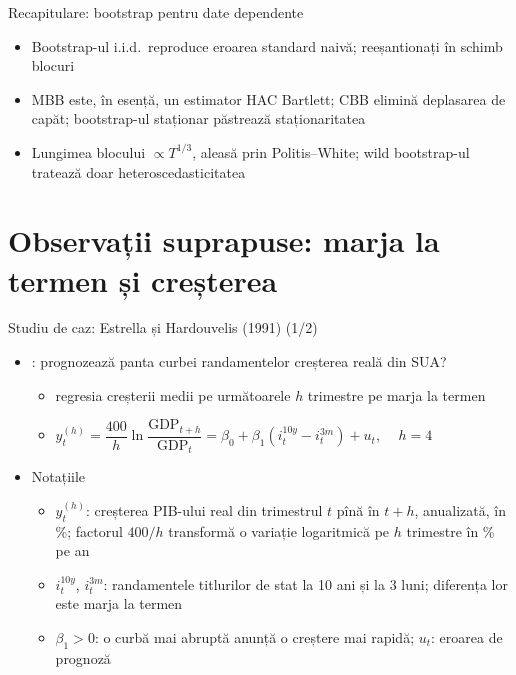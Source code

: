 \begin{frame}{Recapitulare: bootstrap pentru date dependente}
\itemsize{\small}
\begin{itemize}
    \item Bootstrap-ul i.i.d.\ reproduce eroarea standard naivă; reeșantionați în schimb blocuri
    \item MBB  este, în esență, un estimator HAC Bartlett; CBB elimină deplasarea de capăt; bootstrap-ul staționar păstrează staționaritatea
    \item Lungimea blocului $\propto T^{1/3}$, aleasă prin Politis--White; wild bootstrap-ul tratează doar heteroscedasticitatea
\end{itemize}
\end{frame}


\section{Observații suprapuse: marja la termen și creșterea}

\begin{frame}{Studiu de caz: Estrella și Hardouvelis (1991) (1/2)}
\itemsize{\small}
\begin{itemize}
    \item {}: prognozează panta curbei randamentelor creșterea reală din SUA?
    \begin{itemize}
        \item regresia creșterii medii pe următoarele $h$ trimestre pe marja la termen
        \item $y_t^{(h)} = \dfrac{400}{h}\ln\dfrac{\mathrm{GDP}_{t+h}}{\mathrm{GDP}_t} = \beta_0 + \beta_1 (i^{10y}_t - i^{3m}_t) + u_t$, $\quad h = 4$
    \end{itemize}
    \item Notațiile
    \begin{itemize}
        \item $y_t^{(h)}$: creșterea PIB-ului real din trimestrul $t$ pînă în $t + h$, anualizată, în \%; factorul $400/h$ transformă o variație logaritmică pe $h$ trimestre în \% pe an
        \item $i^{10y}_t$, $i^{3m}_t$: randamentele titlurilor de stat la 10 ani și la 3 luni; diferența lor este marja la termen
        \item $\beta_1 > 0$: o curbă mai abruptă anunță o creștere mai rapidă; $u_t$: eroarea de prognoză
    \end{itemize}
\end{itemize}
\end{frame}

